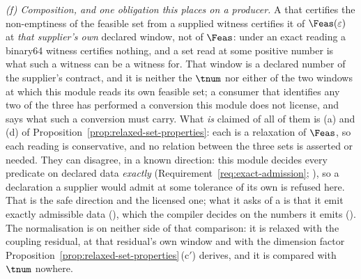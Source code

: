 \begin{remark}
\emph{(f) Composition, and one obligation this places on a producer.} A
 that certifies the non-emptiness of the feasible set from
a supplied witness certifies it of $\Feas(\varepsilon)$ at \emph{that
supplier's own} declared window, not of $\Feas$: under an exact reading a
binary64 witness certifies nothing, and a set read at some positive number
is what such a witness can be a witness for. That window is a declared
number of the supplier's contract, and it is neither the
 $\tnum$ nor either of the two windows at which
this module reads its own feasible set; a consumer that identifies any two
of the three has performed a conversion this module does not license, and
 says what such a conversion must
carry. What \emph{is} claimed of all of them is (a) and (d) of
Proposition~\ref{prop:relaxed-set-properties}: each is a relaxation of
$\Feas$, so each reading is conservative, and no relation between the three
sets is asserted or needed. They can disagree, in a known direction: this
module decides every predicate on declared data \emph{exactly}
(Requirement~\ref{req:exact-admission};
), so a declaration a
supplier would admit at some tolerance of its own is refused here. That is
the safe direction and the licensed one; what it asks of a
 is that it emit exactly admissible data
(), which the compiler decides on the
numbers it emits (). The normalisation is
on neither side of that comparison: it is relaxed with the coupling
residual, at that residual's own window and with the dimension factor
Proposition~\ref{prop:relaxed-set-properties}\,(c$'$) derives, and it is
compared with $\tnum$ nowhere.
\end{remark}
